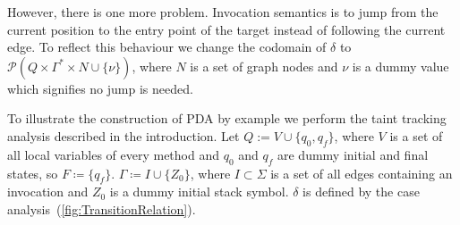 However, there is one more problem.
Invocation semantics is to jump from the current position to the entry point of the target instead of following the current edge.
To reflect this behaviour we change the codomain of $\delta$ to $\mathcal P (Q \times \Gamma^* \times N \cup \{\nu\})$, where $N$ is a set of graph nodes and $\nu$ is a dummy value which signifies no jump is needed.

To illustrate the construction of PDA by example we perform the taint tracking analysis described in the introduction.
Let $Q := V \cup \{q_0, q_f\}$, where $V$ is a set of all local variables of every method and $q_0$ and $q_f$ are dummy initial and final states, so $F \coloneqq \{q_f\}$.
$\Gamma \coloneqq I \cup \{Z_0\}$, where $I \subset \Sigma$ is a set of all edges containing an invocation and $Z_0$ is a dummy initial stack symbol.
$\delta$ is defined by the case analysis~(\ref{fig:TransitionRelation}).
